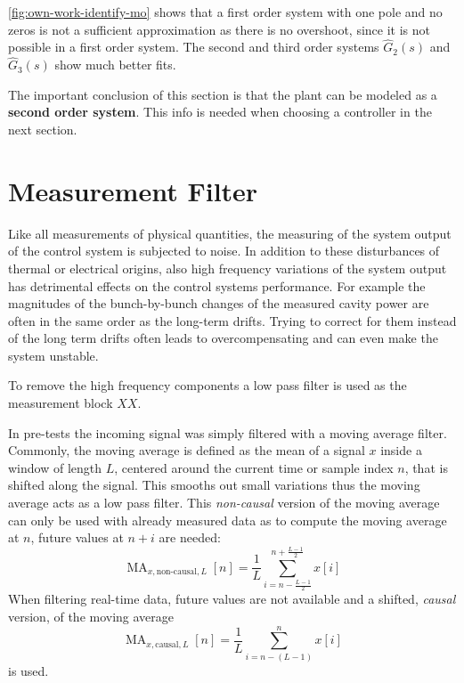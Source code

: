 \autoref{fig:own-work-identify-mo} shows that a first order system with one pole and no zeros is not a sufficient approximation as there is no overshoot, since it is not possible in a first order system. The second and third order systems $\hat{G}_2(s)$ and $\hat{G}_3(s)$ show much better fits.

The important conclusion of this section is that the plant can be modeled as a \textbf{second order system}. This info is needed when choosing a controller in the next section.



\section{Measurement Filter}
Like all measurements of physical quantities, the measuring of the system output of the control system is subjected to noise.
In addition to these disturbances of thermal or electrical origins, also high frequency variations of the system output has detrimental effects on the control systems performance.
For example the magnitudes of the bunch-by-bunch changes of the measured cavity power are often in the same order as the long-term drifts.
Trying to correct for them instead of the long term drifts often leads to overcompensating and can even make the system unstable.

To remove the high frequency components a low pass filter is used as the measurement block $XX$.

In pre-tests the incoming signal was simply filtered with a moving average filter.
Commonly, the moving average is defined as the mean of a signal $x$ inside a window of length $L$, centered around the current time or sample index $n$, that is shifted along the signal. This smooths out small variations thus the moving average acts as a low pass filter.
This \textit{non-causal} version of the moving average can only be used with already measured data as to compute the moving average at $n$, future values at $n+i$ are needed:
\begin{equation}
\operatorname{MA}_{x,\text{non-causal},L}[n] = \frac{1}{L} \sum_{i=n-\frac{L-1}{2}}^{n+\frac{L-1}{2}} x[i]
\end{equation}
When filtering real-time data, future values are not available and a shifted, \textit{causal} version, of the moving average
\begin{equation}\label{eq:causalMA}
\operatorname{MA}_{x,\text{causal},L}[n] = \frac{1}{L} \sum_{i=n-(L-1)}^{n} x[i]
\end{equation}
is used.

